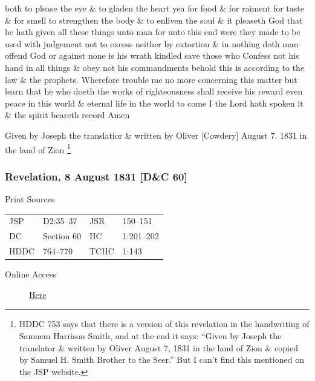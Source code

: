 both to please the eye \& to gladen the heart yea for food \& for raiment for taste \& for smell to strengthen the body \& to enliven the soul \& it pleaseth God that he hath given all these things unto man for unto this end were they made to be used with judgement not to excess neither by extortion \& in nothing doth man offend God or against none is his wrath kindled save those who Confess not his hand in all things \& obey not his commandments behold this is according to the law \& the prophets. Wherefore trouble me no more concerning this matter but learn that he who doeth the works of righteousness shall receive his reward even peace in this world \& eternal life in the world to come I the Lord hath spoken it \& the spirit beareth record Amen
				
				Given by Joseph the translatior \& written by Oliver [Cowdery] August 7. 1831 in the land of Zion%
					\footnote{%
						HDDC 753 says that there is a version of this revelation in the handwriting of Samuem Harrison Smith, and at the end it says: ``Given by Joseph the translator \& written by Oliver August 7, 1831 in the land of Zion \& copied by Samuel H. Smith Brother to the Seer.'' But I can't find this mentioned on the JSP website.
						}
				
		\subsubsection{Revelation, 8 August 1831 [D\&C 60]}
			\label{EMS-1831-JS-8-AUG-1831}
		
			\begin{description}
				\item[Print Sources]
			\end{description}

				\begin{tabular}{p{0.5in}p{1in}p{0.5in}p{1in}}
				JSP	 	& D2:35--37		& JSR 		& 150--151 \\
				DC	 	& Section 60 	& HC 		& 1:201--202 \\
				HDDC 	& 764--770		& TCHC 		& 1:143 \\
				\end{tabular}
			
			\begin{description}
				\item[Online Access] \href{https://www.josephsmithpapers.org/paper-summary/revelation-8-august-1831-dc-60/1}{Here}
			\end{description}
			
